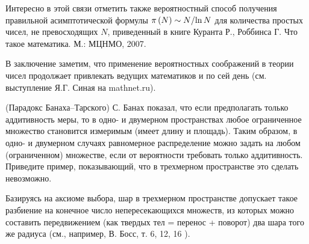 \begin{remark}
Интересно в этой связи отметить также вероятностный способ получения 
правильной асимптотической формулы $\pi \left( N \right)\sim N 
\mathord{\left/ {\vphantom {N {\ln N}}} \right. \kern-\nulldelimiterspace} 
{\ln N}$ для количества простых чисел, не превосходящих $N$, приведенный в книге 
Куранта Р., Роббинса Г. Что такое математика. М.: МЦНМО, 2007.

В заключение заметим, что применение вероятностных соображений в теории 
чисел продолжает привлекать ведущих математиков и по сей день (см. 
выступление Я.Г. Синая  на mathnet.ru).


\end{remark}

\begin{problem}\Star(Парадокс Банаха--Тарского)
С. Банах показал, что если предполагать только аддитивность меры, то в одно- и двумерном пространствах любое ограниченное множество становится измеримым (имеет длину и площадь). Таким образом, в одно- и двумерном случаях равномерное распределение можно задать на любом (ограниченном) множестве, если от вероятности требовать только аддитивность. Приведите пример, показывающий, что в трехмерном пространстве это сделать невозможно. 
\end{problem}
\begin{remark}
Базируясь на аксиоме выбора, шар в трехмерном пространстве допускает такое разбиение на конечное число непересекающихся множеств, из которых можно составить передвижением (как твердых тел = перенос + поворот) два шара того же радиуса (см., например, В. Босс, т. 6, 12, 16 \cite{2013}).
\end{remark}

